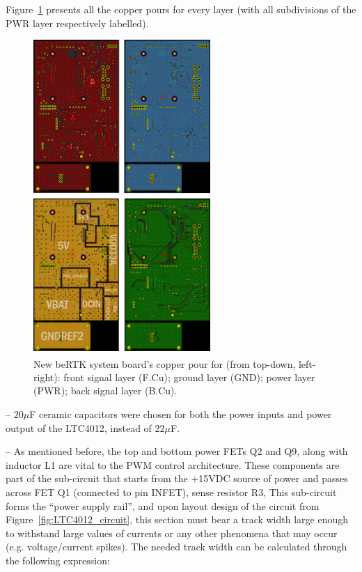Figure~\ref{fig:8_FCu_GND_PWR_BCu} presents all the copper pours for every layer (with all subdivisions of the PWR layer respectively labelled).

\begin{figure}[h]
	\centering
	\includegraphics[width=0.6\textwidth]{Chapters/Figures/chapter5/8_FCu_GND_PWR_BCu.png}
	\caption{New beRTK\textsuperscript{\textregistered} system board's copper pour for (from top-down, left-right): front signal layer (F.Cu); ground layer (GND); power layer (PWR); back signal layer (B.Cu).}
	\label{fig:8_FCu_GND_PWR_BCu}
\end{figure}





-- $20 \mu$F ceramic capacitors were chosen for both the power inputs and power output of the LTC4012, instead of $22 \mu$F. 

-- As mentioned before, the top and bottom power FETs Q2 and Q9, along with inductor L1 are vital to the PWM control architecture. These components are part of the sub-circuit that starts from the +15VDC source of power and passes across FET Q1 (connected to pin INFET), sense resistor R3, 
This sub-circuit forms the ``power supply rail'', and upon layout design of the circuit from Figure~\ref{fig:LTC4012_circuit}, this section must bear a track width large enough to withstand large values of currents or any other phenomena that may occur (e.g. voltage/current spikes). The needed track width can be calculated through the following expression:

